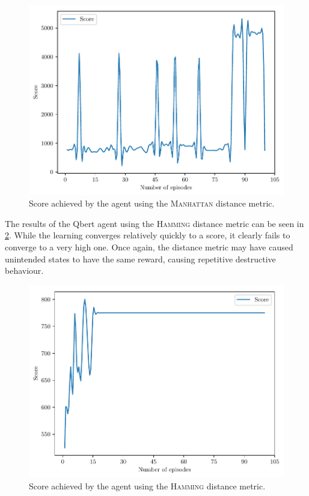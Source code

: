\documentclass[a4paper,titlepage]{article}
\begin{document}
	\begin{figure}[!htb]
		\centering
		\includegraphics[width=\columnwidth]{plots/manhattan.pdf}
		\caption
		{Score achieved by the agent using the \textsc{Manhattan} distance metric.}
		\label{fig:manhattan}
	\end{figure}

	The results of the Qbert agent using the \textsc{Hamming} distance metric can be seen in \cref{fig:hamming}. While the learning converges relatively quickly to a score, it clearly fails to converge to a very high one. Once again, the distance metric may have caused unintended states to have the same reward, causing repetitive destructive behaviour.

	\begin{figure}[!htb]
		\centering
		\includegraphics[width=\columnwidth]{plots/hamming.pdf}
		\caption
		{Score achieved by the agent using the \textsc{Hamming} distance metric.}
		\label{fig:hamming}
	\end{figure}
\end{document}

